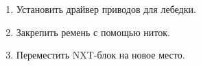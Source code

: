 \begin{enumerate}
\begin{enumerate}
	  \item	Установить драйвер приводов для лебедки.\newline
	  
	  \item	Закрепить ремень с помощью ниток.\newline
	  
	  \item	Переместить NXT-блок на новое место.\newline
	  
    \end{enumerate}     
\end{enumerate}

\fillpage
